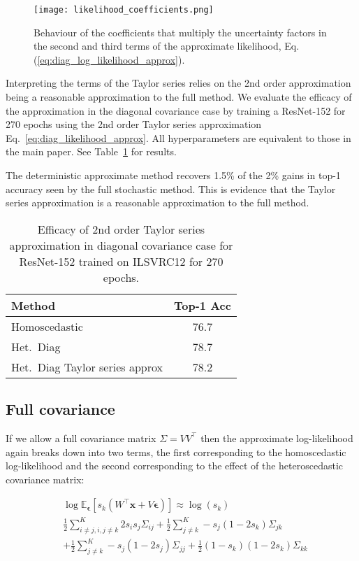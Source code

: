 \documentclass[final]{cvpr}
\newcommand{\brac}[1]{\left[#1\right]}
\begin{document}
\begin{figure}
    \centering
    \texttt{[image: likelihood\_coefficients.png]}
    \caption{Behaviour of the coefficients that multiply the uncertainty factors in the second and third terms of the approximate likelihood, Eq. (\ref{eq:diag_log_likelihood_approx}).}
    \label{fig:likelihood_coefs}
\end{figure}

Interpreting the terms of the Taylor series relies on the 2nd order approximation being a reasonable approximation to the full method. We evaluate the efficacy of the approximation in the diagonal covariance case by training a ResNet-152 for 270 epochs using the 2nd order Taylor series approximation Eq.~\ref{eq:diag_likelihood_approx}. All hyperparameters are equivalent to those in the main paper. See Table~\ref{table:taylor_series_ilsvrc12} for results.

The deterministic approximate method recovers 1.5\% of the 2\% gains in top-1 accuracy seen by the full stochastic method. This is evidence that the Taylor series approximation is a reasonable approximation to the full method.

\begin{table}[tbh]
\centering
\begin{tabular}{lc}
\toprule
Method & Top-1 Acc \\
\midrule
Homoscedastic & 76.7 \\
Het.\ Diag & 78.7 \\ 
Het.\ Diag Taylor series approx & 78.2 \\ 
\bottomrule
\end{tabular}
\caption{Efficacy of 2nd order Taylor series approximation in diagonal covariance case for ResNet-152 trained on ILSVRC12 for 270 epochs.} 
\label{table:taylor_series_ilsvrc12}
\end{table}

\subsection{Full covariance}

If we allow a full covariance matrix $\Sigma = V V^\intercal$ then the approximate log-likelihood again breaks down into two terms, the first corresponding to the homoscedastic log-likelihood and the second corresponding to the effect of the heteroscedastic covariance matrix:

\begin{equation}
\begin{split}
    &\log \mathbb{E}_{\boldsymbol{\epsilon}} \brac{s_k(W^\intercal \mathbf{x} + V \boldsymbol{\epsilon})} \approx \log(s_k) \\ &  \frac{1}{2} \sum_{i \neq j, i,j \neq k}^K 2 s_i s_j \Sigma_{ij} + \frac{1}{2} \sum_{j \neq k}^K - s_j (1 - 2 s_k) \Sigma_{jk} \\
    & + \frac{1}{2} \sum_{j \neq k}^K - s_j (1 - 2 s_j) \Sigma_{jj} + \frac{1}{2} (1 - s_k) (1 - 2 s_k) \Sigma_{kk}
\end{split}
\label{eq:full_log_likelihood_approx}    
\end{equation}
\end{document}
